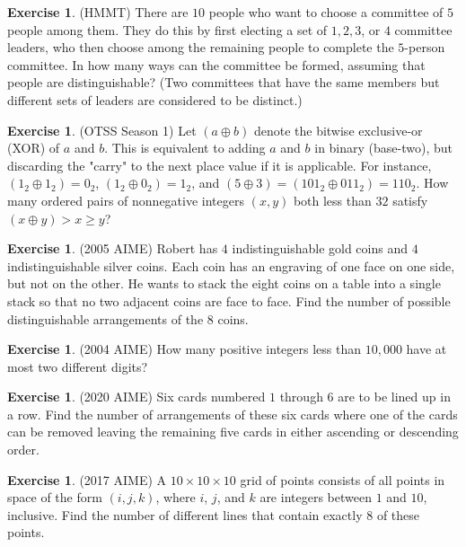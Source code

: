 \documentclass[letterpaper]{article}
\theoremstyle{remark}
\theoremstyle{definition}
\newtheorem{exercise}[thm]{Exercise}
\begin{document}
\begin{exercise}
(HMMT) There are $10$ people who want to choose a committee of $5$ people among them. They do this by first electing a set of $1, 2, 3$, or $4$ committee leaders, who then choose among the remaining people to complete the $5$-person committee. In how many ways can the committee be formed, assuming that people are distinguishable? (Two committees that have the same members but different sets of leaders are considered to be distinct.)
\end{exercise}

\begin{exercise}
(OTSS Season 1) Let $(a \oplus b)$ denote the bitwise exclusive-or (XOR) of $a$ and $b$. This is equivalent to adding $a$ and $b$ in binary (base-two), but discarding the "carry" to the next place value if it is applicable. For instance, $(1_2 \oplus 1_2) = 0_2$, $(1_2 \oplus 0_2) = 1_2$, and $(5\oplus 3)= (101_2\oplus 011_2)= 110_2$. How many ordered pairs of nonnegative integers $(x,y)$ both less than $32$ satisfy $(x \oplus y) > x \geq y$?
\end{exercise}

\begin{exercise}
(2005 AIME) Robert has $4$ indistinguishable gold coins and $4$ indistinguishable silver coins. Each coin has an engraving of one face on one side, but not on the other. He wants to stack the eight coins on a table into a single stack so that no two adjacent coins are face to face. Find the number of possible distinguishable arrangements of the $8$ coins.
\end{exercise}

\begin{exercise}
(2004 AIME) How many positive integers less than $10,000$ have at most two different digits?
\end{exercise}

\begin{exercise}
(2020 AIME) Six cards numbered $1$ through $6$ are to be lined up in a row. Find the number of arrangements of these six cards where one of the cards can be removed leaving the remaining five cards in either ascending or descending order.
\end{exercise}

\begin{exercise}
(2017 AIME) A $10\times 10\times 10$ grid of points consists of all points in space of the form $(i,j,k)$, where $i$, $j$, and $k$ are integers between $1$ and $10$, inclusive. Find the number of different lines that contain exactly $8$ of these points.
\end{exercise}
\end{document}
